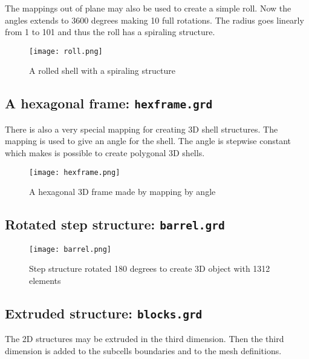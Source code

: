 The mappings out of plane may also be used to create a simple roll.
Now the angles extends to 3600 degrees making 10
full rotations. The radius goes linearly from 1 to 101 and thus the
roll has a spiraling structure.

\begin{figure}
\begin{center}
\texttt{[image: roll.png]}
\end{center}
\caption{A rolled shell with a spiraling structure}
\label{pic11}
\end{figure}




\subsection*{A hexagonal frame: \texttt{hexframe.grd}}

There is also a very special mapping for creating 
3D shell structures. The mapping is used to give an
angle for the shell. The angle is stepwise constant which makes
is possible to create polygonal 3D shells.  

\begin{figure}
\begin{center}
\texttt{[image: hexframe.png]}
\end{center}
\caption{A hexagonal 3D frame made by mapping by angle}
\label{pic11}
\end{figure}





\subsection*{Rotated step structure: \texttt{barrel.grd}}

\begin{figure}
\begin{center}
\texttt{[image: barrel.png]}
\end{center}
\caption{Step structure rotated 180 degrees to create
      3D object with 1312 elements}
\label{pic9}
\end{figure}




\subsection*{Extruded structure: \texttt{blocks.grd}}
The 2D structures may be extruded in the third dimension. 
Then the third dimension is added to the subcells
boundaries and to the mesh definitions.

